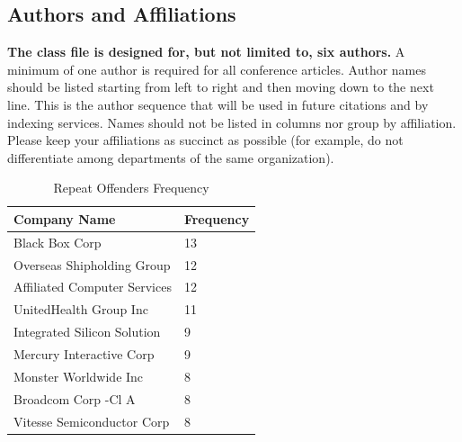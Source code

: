 \documentclass[conference]{IEEEtran}
\begin{document}
\subsection{Authors and Affiliations}
\textbf{The class file is designed for, but not limited to, six authors.} A 
minimum of one author is required for all conference articles. Author names 
should be listed starting from left to right and then moving down to the 
next line. This is the author sequence that will be used in future citations 
and by indexing services. Names should not be listed in columns nor group by 
affiliation. Please keep your affiliations as succinct as possible (for 
example, do not differentiate among departments of the same organization).

\begin{table}[htbp]
\caption{Repeat Offenders Frequency}
\centering
\begin{tabular}{@{}p{6.3cm}p{2.1cm}@{}} 
\toprule
\textbf{\hspace{5mm}Company Name} & \textbf{Frequency}\hspace{5mm} \\
\midrule
\hspace{5mm}Black Box Corp & 13\hspace{5mm} \\
\hspace{5mm}Overseas Shipholding Group & 12\hspace{5mm} \\
\hspace{5mm}Affiliated Computer Services & 12\hspace{5mm} \\
\hspace{5mm}UnitedHealth Group Inc & 11\hspace{5mm} \\
\hspace{5mm}Integrated Silicon Solution & 9\hspace{5mm} \\
\hspace{5mm}Mercury Interactive Corp & 9\hspace{5mm} \\
\hspace{5mm}Monster Worldwide Inc & 8\hspace{5mm} \\
\hspace{5mm}Broadcom Corp -Cl A & 8\hspace{5mm} \\
\hspace{5mm}Vitesse Semiconductor Corp & 8\hspace{5mm} \\

\end{tabular}
\end{table}
\end{document}
